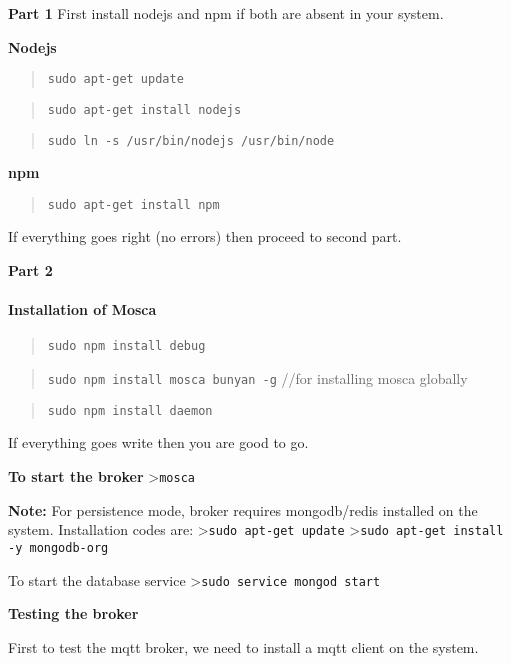 \documentclass[16pt]{article}
\begin{document}
\begin{enumerate}
\textbf{Part 1} First install nodejs and npm if both are absent in your
system.

\textbf{Nodejs}

\begin{quote}
\texttt{sudo apt-get update}
\end{quote}

\begin{quote}
\texttt{sudo apt-get install nodejs}
\end{quote}

\begin{quote}
\texttt{sudo ln -s /usr/bin/nodejs /usr/bin/node}
\end{quote}

\textbf{npm}

\begin{quote}
\texttt{sudo apt-get install npm}
\end{quote}

If everything goes right (no errors) then proceed to second part.

\textbf{Part 2}

\paragraph{Installation of Mosca}

\begin{quote}
\texttt{sudo npm install debug}
\end{quote}

\begin{quote}
\texttt{sudo npm install mosca bunyan -g} //for installing mosca
globally
\end{quote}

\begin{quote}
\texttt{sudo npm install daemon}
\end{quote}

If everything goes write then you are good to go.

\textbf{To start the broker} \textgreater{}\texttt{mosca}

\textbf{Note:} For persistence mode, broker requires mongodb/redis
installed on the system. Installation codes are:
\textgreater{}\texttt{sudo apt-get update}
\textgreater{}\texttt{sudo apt-get install -y mongodb-org}

To start the database service
\textgreater{}\texttt{sudo service mongod start}

{\Large{\textbf{Testing the broker}}}

First to test the mqtt broker, we need to install a mqtt client on the
system.


\end{enumerate}
\end{document}
